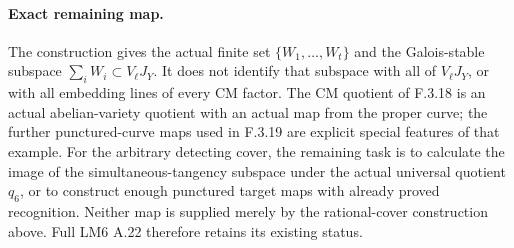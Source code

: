 \paragraph{Exact remaining map.}
The construction gives the actual finite set
$\{W_1,\ldots,W_t\}$ and the Galois-stable subspace
$\sum_iW_i\subset V_\ell J_Y$. It does not identify that
subspace with all of $V_\ell J_Y$, or with all embedding
lines of every CM factor. The CM quotient of F.3.18 is an
actual abelian-variety quotient with an actual map from
the proper curve; the further punctured-curve maps used
in F.3.19 are explicit special features of that example.
For the arbitrary detecting cover, the remaining task is
to calculate the image of the simultaneous-tangency
subspace under the actual universal quotient $q_6$, or to
construct enough punctured target maps with already
proved recognition. Neither map is supplied merely by
the rational-cover construction above. Full LM6 A.22
therefore retains its existing status.
